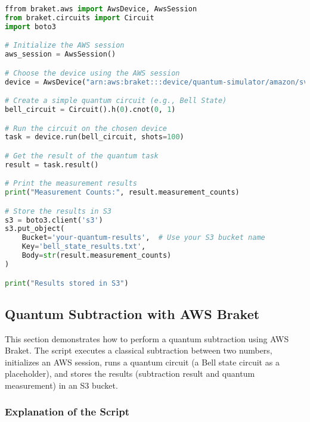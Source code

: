 \documentclass[12pt,a4paper]{article}
\begin{document}
\begin{tcolorbox}[title=src/aws\_braket.py, colback=gray!5!white, colframe=blue!75!black]
\begin{lstlisting}[language=Python]
ffrom braket.aws import AwsDevice, AwsSession
from braket.circuits import Circuit
import boto3

# Initialize the AWS session
aws_session = AwsSession()

# Choose the device using the AWS session
device = AwsDevice("arn:aws:braket:::device/quantum-simulator/amazon/sv1")

# Create a simple quantum circuit (e.g., Bell State)
bell_circuit = Circuit().h(0).cnot(0, 1)

# Run the circuit on the chosen device
task = device.run(bell_circuit, shots=100)

# Get the result of the quantum task
result = task.result()

# Print the measurement results
print("Measurement Counts:", result.measurement_counts)

# Store the results in S3
s3 = boto3.client('s3')
s3.put_object(
    Bucket='your-quantum-results',  # Use your S3 bucket name
    Key='bell_state_results.txt',
    Body=str(result.measurement_counts)
)

print("Results stored in S3")

\end{lstlisting}
\end{tcolorbox}


\subsection{Quantum Subtraction with AWS Braket}

This section demonstrates how to perform a quantum subtraction using AWS Braket. The script executes a classical subtraction between two numbers, initializes an AWS session, runs a quantum circuit (a Bell state circuit as a placeholder), and stores the results (subtraction result and quantum measurement) in an S3 bucket.

\subsubsection{Explanation of the Script}
\end{document}
